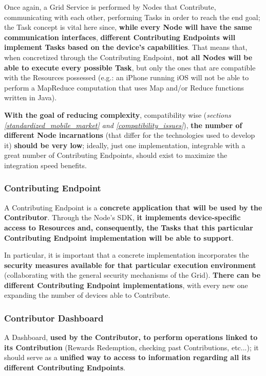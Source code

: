 Once again, a Grid Service is performed by Nodes that Contribute, communicating with each other, performing Tasks in order to reach the end goal; the Task concept is vital here since, \textbf{while every Node will have the same communication interfaces}, \textbf{different Contributing Endpoints will implement Tasks based on the device's capabilities}. That means that, when concretized through the Contributing Endpoint, \textbf{not all Nodes will be able to execute every possible Task}, but only the ones that are compatible with the Resources possessed (e.g.: an iPhone running iOS will not be able to perform a MapReduce computation that uses Map and/or Reduce functions written in Java).

\textbf{With the goal of reducing complexity}, compatibility wise (\textit{sections \ref{standardized_mobile_market} and \ref{compatibility_issues}}), \textbf{the number of different Node incarnations} (that differ for the technologies used to develop it) \textbf{should be very low}; ideally, just one implementation, integrable with a great number of Contributing Endpoints, should exist to maximize the integration speed benefits.

\subsubsection{Contributing Endpoint}
A Contributing Endpoint is a \textbf{concrete application that will be used by the Contributor}. Through the Node's SDK, \textbf{it implements device-specific access to Resources and, consequently, the Tasks that this particular Contributing Endpoint implementation will be able to support}.

In particular, it is important that a concrete implementation incorporates the \textbf{security measures available for that particular execution environment} (collaborating with the general security mechanisms of the Grid).
\textbf{There can be different Contributing Endpoint implementations}, with every new one expanding the number of devices able to Contribute.

\subsubsection{Contributor Dashboard}
A Dashboard, \textbf{used by the Contributor, to perform operations linked to its Contribution} (Rewards Redemption, checking past Contributions, etc...); it should serve as a \textbf{unified way to access to information regarding all its different Contributing Endpoints}.

